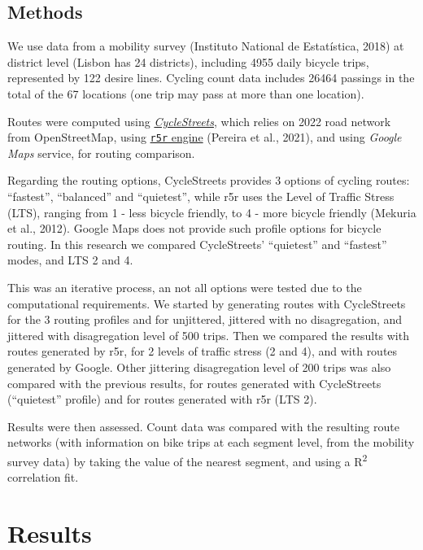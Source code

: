 \documentclass{isprs} %
\begin{document}
\hypertarget{methods}{%
\subsection{Methods}\label{methods}}

We use data from a mobility survey (Instituto National de Estatística, 2018) at district level (Lisbon has 24 districts), including 4955 daily bicycle trips, represented by 122 desire lines.
Cycling count data includes 26464 passings in the total of the 67 locations (one trip may pass at more than one location).

Routes were computed using \href{https://cyclestreets.net}{\emph{CycleStreets}}, which relies on 2022 road network from OpenStreetMap, using \href{https://ipeagit.github.io/r5r/}{\texttt{r5r} engine} (Pereira et al., 2021), and using \emph{Google Maps} service, for routing comparison.

Regarding the routing options, CycleStreets provides 3 options of cycling routes: ``fastest'', ``balanced'' and ``quietest'', while r5r uses the Level of Traffic Stress (LTS), ranging from 1 - less bicycle friendly, to 4 - more bicycle friendly (Mekuria et al., 2012). Google Maps does not provide such profile options for bicycle routing.
In this research we compared CycleStreets' ``quietest'' and ``fastest'' modes, and LTS 2 and 4.

This was an iterative process, an not all options were tested due to the computational requirements. We started by generating routes with CycleStreets for the 3 routing profiles and for unjittered, jittered with no disagregation, and jittered with disagregation level of 500 trips. Then we compared the results with routes generated by r5r, for 2 levels of traffic stress (2 and 4), and with routes generated by Google. Other jittering disagregation level of 200 trips was also compared with the previous results, for routes generated with CycleStreets (``quietest'' profile) and for routes generated with r5r (LTS 2).

Results were then assessed. Count data was compared with the resulting route networks (with information on bike trips at each segment level, from the mobility survey data) by taking the value of the nearest segment, and using a R\textsuperscript{2} correlation fit.

\hypertarget{results}{%
\section{Results}\label{results}}
\end{document}
